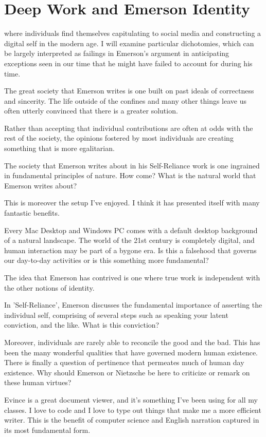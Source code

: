 \documentclass[12pt,letterpaper]{article}
\begin{document}
\section{Deep Work and Emerson Identity}

where individuals find themselves capitulating to social media
and constructing a digital self in the modern age.  I will
examine particular dichotomies, which can be largely
interpreted as failings in Emerson's argument in
anticipating exceptions seen in our time that he might have
failed to account for during his time.

The great society that Emerson writes is one built on past
ideals of correctness and sincerity.  The life outside of
the confines and many other things leave us often utterly
convinced that there is a greater solution.

Rather than accepting that individual contributions are
often at odds with the rest of the society, the opinions
fostered by most individuals are creating something that is
more egalitarian.

The society that Emerson writes about in his Self-Reliance work is one ingrained in fundamental principles of nature. How come?  What is the natural world that Emerson writes about?

This is moreover the setup I've enjoyed.  I think it has
presented itself with many fantastic benefits.

Every Mac Desktop and Windows PC comes with a default desktop background of a natural landscape.  The world of the 21st century is completely digital, and human interaction may be part of a bygone era.  Is this a falsehood that governs our day-to-day activities or is this something more fundamental?

The idea that Emerson has contrived is one where true work is independent with the other notions of identity. 

In 'Self-Reliance', Emerson discusses the fundamental
importance of asserting the individual self, comprising of
several steps such as speaking your latent conviction, and
the like.  What is this conviction?

Moreover, individuals are rarely able to reconcile the good
and the bad.  This has been the many wonderful qualities
that have governed modern human existence.  There is finally
a question of pertinence that permeates much of human day
existence.  Why should Emerson or Nietzsche be here to
criticize or remark on these human virtues?

Evince is a great document viewer, and it's something I've
been using for all my classes.  I love to code and I love to
type out things that make me a more efficient writer.  This
is the benefit of computer science and English narration
captured in its most fundamental form.
\end{document}
